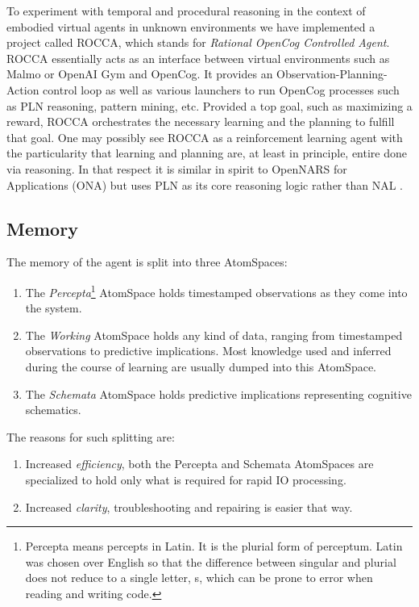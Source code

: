 \documentclass[runningheads]{llncs}
\begin{document}
To experiment with temporal and procedural reasoning in the context of
embodied virtual agents in unknown environments we have implemented a
project called ROCCA, which stands for \emph{Rational OpenCog
Controlled Agent}.  ROCCA essentially acts as an interface between
virtual environments such as Malmo \cite{TODO} or OpenAI Gym
\cite{TODO} and OpenCog.  It provides an Observation-Planning-Action
control loop as well as various launchers to run OpenCog processes
such as PLN reasoning, pattern mining, etc.
Provided a top goal, such as maximizing a reward, ROCCA orchestrates
the necessary learning and the planning to fulfill that goal.
One may possibly see ROCCA as a reinforcement learning agent with the
particularity that learning and planning are, at least in principle,
entire done via reasoning.  In that respect it is similar in spirit to
OpenNARS for Applications (ONA) \cite{TODO} but uses PLN as its core
reasoning logic rather than NAL \cite{TODO}.\\

\subsection{Memory}

The memory of the agent is split into three AtomSpaces:
\begin{enumerate}
\item The \emph{Percepta}\footnote{Percepta means percepts in Latin.
    It is the plurial form of perceptum.  Latin was chosen over
    English so that the difference between singular and plurial does
    not reduce to a single letter, s, which can be prone to error when
    reading and writing code.}  AtomSpace holds timestamped
  observations as they come into the system.
\item The \emph{Working} AtomSpace holds any kind of data, ranging
  from timestamped observations to predictive implications.  Most
  knowledge used and inferred during the course of learning are
  usually dumped into this AtomSpace.
\item The \emph{Schemata} AtomSpace holds predictive implications
  representing cognitive schematics.
\end{enumerate}
The reasons for such splitting are:
\begin{enumerate}
\item Increased \emph{efficiency}, both the Percepta and Schemata
  AtomSpaces are specialized to hold only what is required for rapid
  IO processing.
\item Increased \emph{clarity}, troubleshooting and repairing is
  easier that way.
\end{enumerate}
\end{document}
